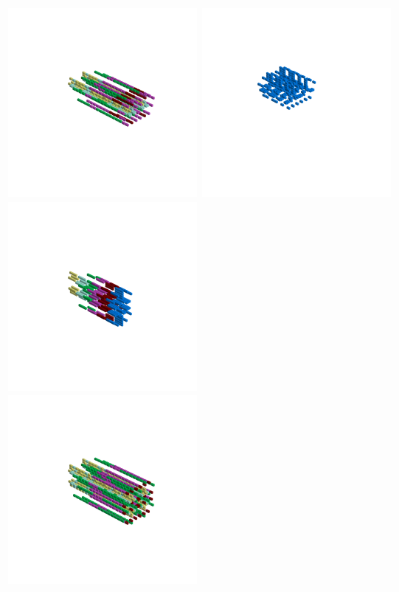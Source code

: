 \begin{minipage}[b]{0.48\linewidth}                                       
  \begin{figure}[H]
      \centering
        \vspace*{-1cm}
        \hspace*{-2cm}
        \includegraphics[width=5cm]{src/symmetries/pattern9_1-45.png}%
        \hspace*{-3cm}
        \includegraphics[width=5cm]{src/symmetries/pattern9_2-45.png}\\
        \vspace*{-3cm}
        \hspace*{-4cm}
        \includegraphics[width=5cm]{src/symmetries/pattern9_3-45.png} \\
        \vspace*{-5cm}
        \includegraphics[width=5cm]{src/symmetries/pattern9_4-45.png}
        \vspace*{-1cm}
  \caption*{}
  \end{figure}
\end{minipage}

